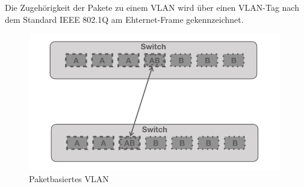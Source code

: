   Die Zugehörigkeit der Pakete zu einem VLAN wird über einen VLAN-Tag nach dem Standard  IEEE 802.1Q am Ehternet-Frame gekennzeichnet. 

\begin{figure}[h]
\centering
	\includegraphics[width=0.8\linewidth,height=6cm]{vlanpak.001.jpeg}
	\caption{Paketbasiertes VLAN}
	\label{vlanpak}
\end{figure}


